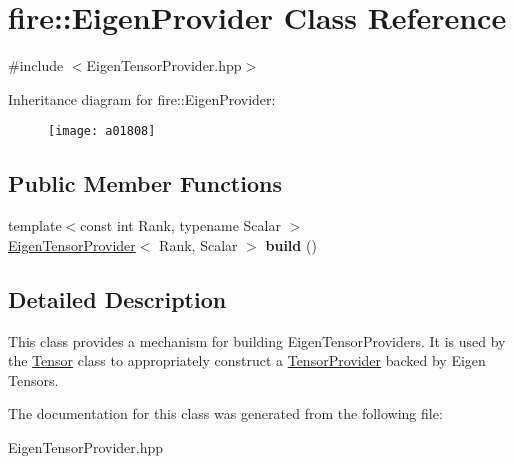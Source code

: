 \hypertarget{a01808}{}\section{fire\+:\+:Eigen\+Provider Class Reference}
\label{a01808}


{\ttfamily \#include $<$Eigen\+Tensor\+Provider.\+hpp$>$}

Inheritance diagram for fire\+:\+:Eigen\+Provider\+:\begin{figure}[H]
\begin{center}
\leavevmode
\texttt{[image: a01808]}
\end{center}
\end{figure}
\subsection*{Public Member Functions}
\begin{DoxyCompactItemize}
\item 
\mbox{\label{a01808_ab9bfc7a0004ea10d57442f495c468b2e}} 
{\footnotesize template$<$const int Rank, typename Scalar $>$ }\\\hyperlink{a01804}{Eigen\+Tensor\+Provider}$<$ Rank, Scalar $>$ {\bfseries build} ()
\end{DoxyCompactItemize}


\subsection{Detailed Description}
This class provides a mechanism for building Eigen\+Tensor\+Providers. It is used by the \hyperlink{a01812}{Tensor} class to appropriately construct a \hyperlink{a01816}{Tensor\+Provider} backed by Eigen Tensors. 

The documentation for this class was generated from the following file\+:\begin{DoxyCompactItemize}
\item 
Eigen\+Tensor\+Provider.\+hpp\end{DoxyCompactItemize}
